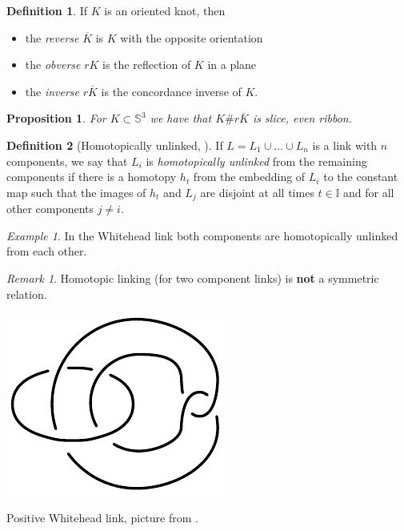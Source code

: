\documentclass[nobib]{tufte-book} %
\newtheorem{proposition}{Proposition}
\theoremstyle{definition}
\newtheorem{definition}{Definition}
\theoremstyle{remark}
\newtheorem{remark}{Remark}
\newtheorem{example}{Example}
\newcommand{\sphere}[1]{\mathbb{S}^{#1}}
\newcommand{\interval}{\mathbb{I}}
\begin{document}
\begin{definition}
	If $K$ is an oriented knot, then
	\begin{itemize}
		\item the \textit{reverse} $\overline{K}$
		is $K$ with the opposite orientation
		
		\item the \textit{obverse} $rK$ is
		the reflection of $K$ in a plane
		
		\item the \textit{inverse} $r \overline{K}$
		is the concordance inverse of $K$.
	\end{itemize}
\end{definition}

\begin{proposition}
	For $K \subset \sphere{3}$ we have that
	$K \# r \overline{K}$ is slice, even ribbon.
\end{proposition}


\begin{definition}[Homotopically unlinked,
		{\citep[3.F.9.]{rolfsen2003knots}}]
	If $L = L_{1} \cup \ldots \cup L_{n}$ is a link with $n$
	components, we say that $L_i$ is
	\textit{homotopically unlinked} 
	from the remaining components if there is
	a homotopy $h_{t}$ from the embedding of $L_{i}$ to the constant
	map such that the images of $h_{t}$ and $L_{j}$ are disjoint
	at all times $t \in \interval$ and for all other components $j \ne i$.
\end{definition}

\begin{example}
	In the Whitehead link both components are
	homotopically unlinked from each other.
\end{example}

\begin{remark}
	Homotopic linking (for two component links)
	is \textbf{not} a symmetric relation.
	\begin{marginfigure}
		\begin{center}
			\includegraphics[width=0.5\linewidth]{./pictures/positive_whitehead_link.pdf}
		\end{center}
		\caption{Positive Whitehead link,
			picture from \citep{meier2015distinguishing}.}
		\label{fig:positive_whitehead_link}
	\end{marginfigure}
\end{remark}
\end{document}
